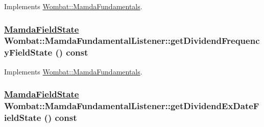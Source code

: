 Implements \hyperlink{classWombat_1_1MamdaFundamentals_adfde192656e67be8ce319914e87b29a}{Wombat::Mamda\-Fundamentals}.\hypertarget{classWombat_1_1MamdaFundamentalListener_ef68fbedac7b4c18d2883a381faa3c70}{
\subsubsection[getDividendFrequencyFieldState]{\setlength{\rightskip}{0pt plus 5cm}\hyperlink{namespaceWombat_93aac974f2ab713554fd12a1fa3b7d2a}{Mamda\-Field\-State} Wombat::Mamda\-Fundamental\-Listener::get\-Dividend\-Frequency\-Field\-State () const}}
\label{classWombat_1_1MamdaFundamentalListener_ef68fbedac7b4c18d2883a381faa3c70}




Implements \hyperlink{classWombat_1_1MamdaFundamentals_13fb32e1e1b2be497a45b01acee43935}{Wombat::Mamda\-Fundamentals}.\hypertarget{classWombat_1_1MamdaFundamentalListener_d36dbb75077ac135466024235858667d}{
\subsubsection[getDividendExDateFieldState]{\setlength{\rightskip}{0pt plus 5cm}\hyperlink{namespaceWombat_93aac974f2ab713554fd12a1fa3b7d2a}{Mamda\-Field\-State} Wombat::Mamda\-Fundamental\-Listener::get\-Dividend\-Ex\-Date\-Field\-State () const}}
\label{classWombat_1_1MamdaFundamentalListener_d36dbb75077ac135466024235858667d}




